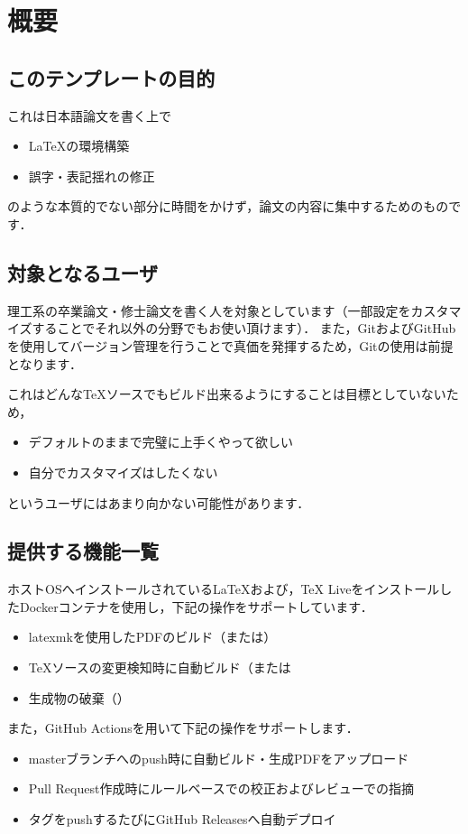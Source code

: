 \documentclass[../main]{subfiles}
\begin{document}
\section{概要}

\subsection{このテンプレートの目的}

これは日本語論文を書く上で

\begin{itemize}
    \item LaTeXの環境構築
    \item 誤字・表記揺れの修正
\end{itemize}

のような本質的でない部分に時間をかけず，論文の内容に集中するためのものです．

\subsection{対象となるユーザ}
理工系の卒業論文・修士論文を書く人を対象としています（一部設定をカスタマイズすることでそれ以外の分野でもお使い頂けます）．
また，GitおよびGitHubを使用してバージョン管理を行うことで真価を発揮するため，Gitの使用は前提となります．


これはどんなTeXソースでもビルド出来るようにすることは目標としていないため，

\begin{itemize}
    \item デフォルトのままで完璧に上手くやって欲しい
    \item 自分でカスタマイズはしたくない
\end{itemize}

というユーザにはあまり向かない可能性があります．

\subsection{提供する機能一覧}

ホストOSへインストールされているLaTeXおよび，TeX LiveをインストールしたDockerコンテナを使用し，下記の操作をサポートしています．

\begin{itemize}
    \item latexmkを使用したPDFのビルド（または）
    \item TeXソースの変更検知時に自動ビルド（または
    \item 生成物の破棄（）
\end{itemize}

また，GitHub Actionsを用いて下記の操作をサポートします．

\begin{itemize}
    \item masterブランチへのpush時に自動ビルド・生成PDFをアップロード
    \item Pull Request作成時にルールベースでの校正およびレビューでの指摘
    \item タグをpushするたびにGitHub Releasesへ自動デプロイ
\end{itemize}
\end{document}
